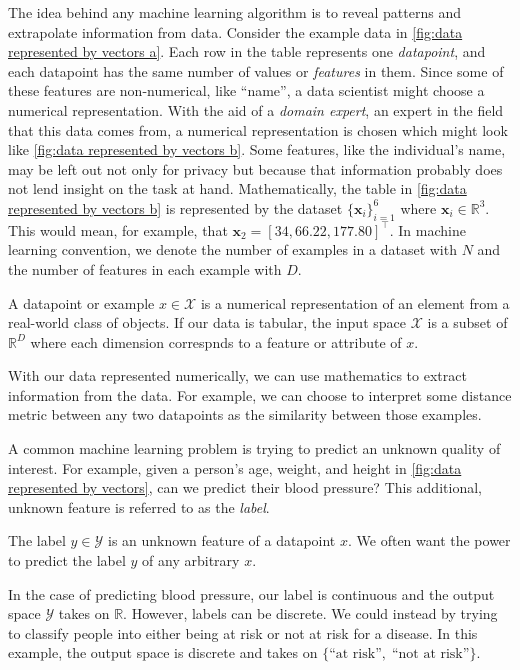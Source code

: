 The idea behind any machine learning algorithm is to reveal patterns and extrapolate information from data. Consider the example data in \autoref{fig:data represented by vectors a}. Each row in the table represents one \emph{datapoint}, and each datapoint has the same number of values or \emph{features} in them. Since some of these features are non-numerical, like ``name'', a data scientist might choose a numerical representation. With the aid of a \emph{domain expert}, an expert in the field that this data comes from, a numerical representation is chosen which might look like \autoref{fig:data represented by vectors b}. Some features, like the individual's name, may be left out not only for privacy but because that information probably does not lend insight on the task at hand. Mathematically, the table in \autoref{fig:data represented by vectors b} is represented by the dataset $\{\bm x_i\}_{i=1}^{6}$ where $\bm x_i \in \mathbb R^3$. This would mean, for example, that $\bm x_2 = [34, 66.22, 177.80]^\top$. In machine learning convention, we denote the number of examples in a dataset with $N$ and the number of features in each example with $D$. 
\begin{definition}[datapoint]
    A datapoint or example $x \in \mathcal X$ is a numerical representation of an element from a real-world class of objects. If our data is tabular, the input space $\mathcal X$ is a subset of $\mathbb R^D$ where each dimension correspnds to a feature or attribute of $x$.
\end{definition}

With our data represented numerically, we can use mathematics to extract information from the data. For example, we can choose to interpret some distance metric between any two datapoints as the similarity between those examples.

A common machine learning problem is trying to predict an unknown quality of interest. For example, given a person's age, weight, and height in \autoref{fig:data represented by vectors}, can we predict their blood pressure? This additional, unknown feature is referred to as the \emph{label}.
\begin{definition}[label]
    The label $y \in \mathcal Y$ is an unknown feature of a datapoint $x$. We often want the power to predict the label $y$ of any arbitrary $x$.
\end{definition}

In the case of predicting blood pressure, our label is continuous and the output space $\mathcal Y$ takes on $\mathbb R$. However, labels can be discrete. We could instead by trying to classify people into either being at risk or not at risk for a disease. In this example, the output space is discrete and takes on $\{ \text{``at risk''},\; \text{``not at risk''} \}$.

